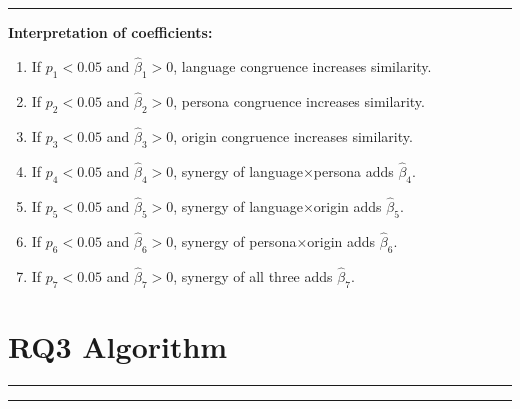 \begin{algorithmic}[1]
 \vspace{1em}\hrule\vspace{0.5em}
  \Statex\textbf{Interpretation of coefficients:}
  \begin{enumerate}[label=(\alph*)]
    \item If $p_1<0.05$ and $\hat\beta_1>0$, language congruence increases similarity.
    \item If $p_2<0.05$ and $\hat\beta_2>0$, persona congruence increases similarity.
    \item If $p_3<0.05$ and $\hat\beta_3>0$, origin congruence increases similarity.
    \item If $p_4<0.05$ and $\hat\beta_4>0$, synergy of language×persona adds $\hat\beta_4$\footnotemark.
    \item If $p_5<0.05$ and $\hat\beta_5>0$, synergy of language×origin adds $\hat\beta_5$.
    \item If $p_6<0.05$ and $\hat\beta_6>0$, synergy of persona×origin adds $\hat\beta_6$.
    \item If $p_7<0.05$ and $\hat\beta_7>0$, synergy of all three adds $\hat\beta_7$.
  \end{enumerate}
\end{algorithmic}

\section{RQ3 Algorithm}
\vspace{0.5em}\noindent\hrule\vspace{0.5em}

\label{alg:rq3_dimensions}

\vspace{-0.5em}\hrule\vspace{0.5em}

